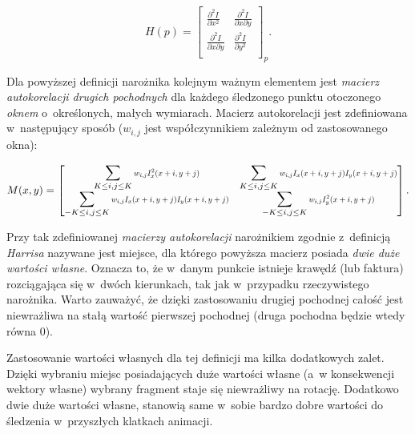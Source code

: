     \[
      H(p) =
        \begin{bmatrix}
          \frac{\partial^2 I}{\partial x^2} & \frac{\partial^2 I}{\partial x\partial y} \\
          \frac{\partial^2 I}{\partial x\partial y} & \frac{\partial^2 I}{\partial y^2} \\
        \end{bmatrix}_{p}.
    \]

    \newpage
    Dla powyższej definicji narożnika kolejnym ważnym elementem jest \textit{macierz autokorelacji drugich pochodnych} dla każdego śledzonego punktu otoczonego \textit{oknem} o~określonych, małych wymiarach. Macierz autokorelacji jest zdefiniowana w~następujący sposób ($w_{i,j}$ jest współczynnikiem zależnym od zastosowanego okna):

    \[
      M(x, y) =
        \begin{bmatrix}
            \displaystyle\sum\limits_{K \le i, j \le K}
              \scalemath{0.75}{w_{i,j} I_{x}^{2} (x + i, y + j)} &
            \displaystyle\sum\limits_{K \le i, j \le K}
              \scalemath{0.75}{w_{i,j} I_{x} (x + i, y + j) I_{y} (x + i, y + j)} \\

            \displaystyle\sum\limits_{-K \le i, j \le K}
              \scalemath{0.75}{w_{i,j} I_{x} (x + i, y + j) I_{y} (x + i, y + j)} &
            \displaystyle\sum\limits_{-K \le i, j \le K}
              \scalemath{0.75}{w_{i,j} I_{y}^{2} (x + i, y + j)} \\
        \end{bmatrix}.
    \]

    Przy tak zdefiniowanej \textit{macierzy autokorelacji} narożnikiem zgodnie z~definicją \textit{Harrisa} nazywane jest miejsce, dla którego powyższa macierz posiada \textit{dwie duże wartości własne}. Oznacza to, że w~danym punkcie istnieje krawędź (lub faktura) rozciągająca się w~dwóch kierunkach, tak jak w~przypadku rzeczywistego narożnika. Warto zauważyć, że dzięki zastosowaniu drugiej pochodnej całość jest niewrażliwa na stałą wartość pierwszej pochodnej (druga pochodna będzie wtedy równa $0$).

    Zastosowanie wartości własnych dla tej definicji ma kilka dodatkowych zalet. Dzięki wybraniu miejsc posiadających duże wartości własne (a~w konsekwencji wektory własne) wybrany fragment staje się niewrażliwy na rotację. Dodatkowo dwie duże wartości własne, stanowią same w~sobie bardzo dobre wartości do śledzenia w~przyszłych klatkach animacji.

